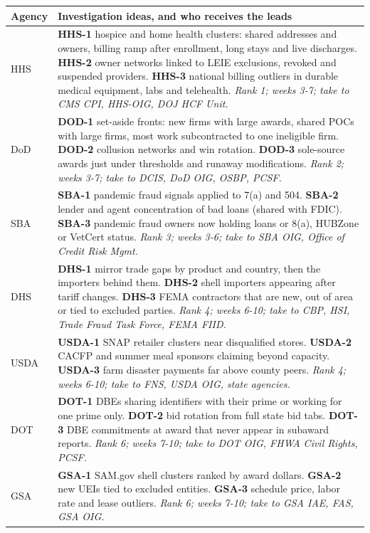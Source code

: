 \documentclass[letterpaper,11pt]{article}
\begin{document}
\begin{longtable}[l]{@{}l>{\raggedright\arraybackslash}p{}@{}}
\rowcolor{coolblack}\leavevmode\color{white}\bfseries Agency & \leavevmode\color{white}\bfseries Investigation ideas, and who receives the leads \\
\endhead
HHS & \textbf{HHS-1} hospice and home health clusters: shared addresses and owners, billing ramp after enrollment, long stays and live discharges. \textbf{HHS-2} owner networks linked to LEIE exclusions, revoked and suspended providers. \textbf{HHS-3} national billing outliers in durable medical equipment, labs and telehealth. \emph{Rank 1; weeks 3-7; take to CMS CPI, HHS-OIG, DOJ HCF Unit.} \\
DoD & \textbf{DOD-1} set-aside fronts: new firms with large awards, shared POCs with large firms, most work subcontracted to one ineligible firm. \textbf{DOD-2} collusion networks and win rotation. \textbf{DOD-3} sole-source awards just under thresholds and runaway modifications. \emph{Rank 2; weeks 3-7; take to DCIS, DoD OIG, OSBP, PCSF.} \\
SBA & \textbf{SBA-1} pandemic fraud signals applied to 7(a) and 504. \textbf{SBA-2} lender and agent concentration of bad loans (shared with FDIC). \textbf{SBA-3} pandemic fraud owners now holding loans or 8(a), HUBZone or VetCert status. \emph{Rank 3; weeks 3-6; take to SBA OIG, Office of Credit Risk Mgmt.} \\
DHS & \textbf{DHS-1} mirror trade gaps by product and country, then the importers behind them. \textbf{DHS-2} shell importers appearing after tariff changes. \textbf{DHS-3} FEMA contractors that are new, out of area or tied to excluded parties. \emph{Rank 4; weeks 6-10; take to CBP, HSI, Trade Fraud Task Force, FEMA FIID.} \\
USDA & \textbf{USDA-1} SNAP retailer clusters near disqualified stores. \textbf{USDA-2} CACFP and summer meal sponsors claiming beyond capacity. \textbf{USDA-3} farm disaster payments far above county peers. \emph{Rank 4; weeks 6-10; take to FNS, USDA OIG, state agencies.} \\
DOT & \textbf{DOT-1} DBEs sharing identifiers with their prime or working for one prime only. \textbf{DOT-2} bid rotation from full state bid tabs. \textbf{DOT-3} DBE commitments at award that never appear in subaward reports. \emph{Rank 6; weeks 7-10; take to DOT OIG, FHWA Civil Rights, PCSF.} \\
GSA & \textbf{GSA-1} SAM.gov shell clusters ranked by award dollars. \textbf{GSA-2} new UEIs tied to excluded entities. \textbf{GSA-3} schedule price, labor rate and lease outliers. \emph{Rank 6; weeks 7-10; take to GSA IAE, FAS, GSA OIG.} \\
\end{longtable}\endgroup
\end{document}
